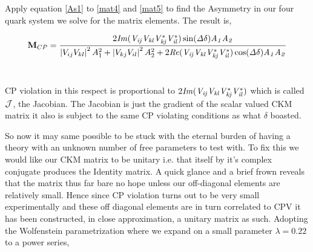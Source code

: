 Apply equation \ref{As1} to \ref{mat4} and \ref{mat5} to find the Asymmetry in our four quark system we solve for the matrix elements. The result is,

\begin{equation}\label{Asm1}
 \mathbf{M}_{CP}= \frac{ 2\it{I}m (V_{ij} V_{kl} V^{*}_{kj }V^{*}_{il} )\sin(\Delta\delta) A_{1} A_{2}}{\left| V_{ij} V_{kl}\right|^2 A^{2}_{1} + \left|V_{kj}V_{il}\right|^2 A^{2}_{2} +2 \it{R} e (V_{ij} V_{kl} V^{*}_{kj} V^{*}_{il} ) \cos(\Delta\delta)A_1 A_2}
\end{equation}\

CP violation in this respect is proportional to $2\it{I}m(V_{ij}V_{kl}V^{*}_{kj}V^{*}_{il})$ which is called $\cal{J}$, the Jacobian. The Jacobian is just the gradient of the scalar valued CKM matrix it also is subject to the same CP violating conditions as what $\delta$ boasted.

So now it may same possible to be stuck with the eternal burden of having a theory with an unknown number of free parameters to test with. To fix this we would like our CKM matrix to be unitary i.e. that itself by it's complex conjugate produces the Identity matrix. A quick glance and a brief frown reveals that the matrix thus far bare no hope unless our off-diagonal elements are relatively small. Hence since CP violation turns out to be very small experimentally and these off diagonal elements are in turn correlated to CPV it has been constructed, in close approximation, a unitary matrix as such. Adopting the Wolfenstein parametrization \cite{CKM10} where we expand on a small parameter $\lambda = 0.22$ to a power series,

